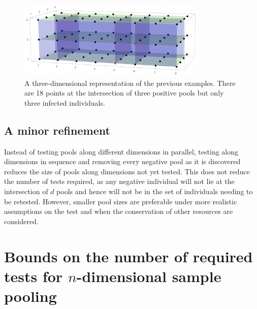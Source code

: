 \documentclass[letterpaper]{article}
\begin{document}
\begin{figure}
\centering
\includegraphics[width=0.8\textwidth]{Fig3DimPooling.png}
\caption{A three-dimensional representation of the previous
	examples. There are 18 points at the intersection of three positive
	pools but only three infected individuals.}
\end{figure}


\hypertarget{a-minor-refinement}{%
\subsection{A minor refinement}\label{a-minor-refinement}}

Instead of testing pools along different dimensions in parallel, testing
along dimensions in sequence and removing every negative pool as it is
discovered reduces the size of pools along dimensions not yet tested.
This does not reduce the number of tests required, as any negative
individual will not lie at the intersection of $d$ pools and hence
will not be in the set of individuals needing to be retested. However,
smaller pool sizes are preferable under more realistic assumptions on
the test and when the conservation of other resources are considered.

\hypertarget{bounds-on-the-number-of-required-tests-for-n-dimensional-sample-pooling}{%
\section{Bounds on the number of required tests for $n$-dimensional sample pooling}
\label{bounds-on-the-number-of-required-tests-for-n-dimensional-sample-pooling}
}
\end{document}
